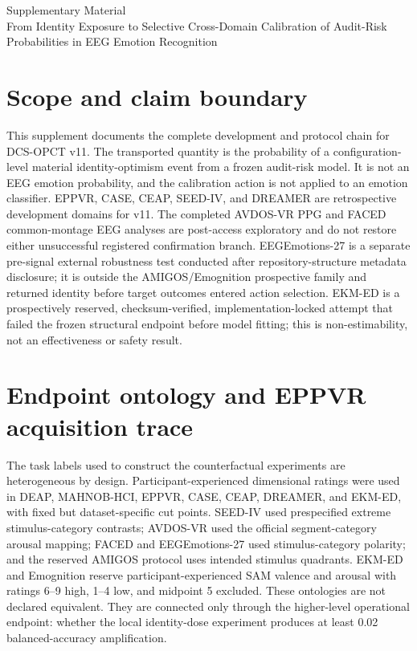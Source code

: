 \documentclass[preprint,12pt]{elsarticle}
\begin{document}
\renewcommand{\thetable}{S\arabic{table}}

\begin{center}
{\Large Supplementary Material}\\[0.5em]
{\large From Identity Exposure to Selective Cross-Domain Calibration of Audit-Risk Probabilities in EEG Emotion Recognition}
\end{center}

\section{Scope and claim boundary}

This supplement documents the complete development and protocol chain for DCS-OPCT v11. The transported quantity is the probability of a configuration-level material identity-optimism event from a frozen audit-risk model. It is not an EEG emotion probability, and the calibration action is not applied to an emotion classifier. EPPVR, CASE, CEAP, SEED-IV, and DREAMER are retrospective development domains for v11. The completed AVDOS-VR PPG and FACED common-montage EEG analyses are post-access exploratory and do not restore either unsuccessful registered confirmation branch. EEGEmotions-27 is a separate pre-signal external robustness test conducted after repository-structure metadata disclosure; it is outside the AMIGOS/Emognition prospective family and returned identity before target outcomes entered action selection. EKM-ED is a prospectively reserved, checksum-verified, implementation-locked attempt that failed the frozen structural endpoint before model fitting; this is non-estimability, not an effectiveness or safety result.

\section{Endpoint ontology and EPPVR acquisition trace}

The task labels used to construct the counterfactual experiments are heterogeneous by design. Participant-experienced dimensional ratings were used in DEAP, MAHNOB-HCI, EPPVR, CASE, CEAP, DREAMER, and EKM-ED, with fixed but dataset-specific cut points. SEED-IV used prespecified extreme stimulus-category contrasts; AVDOS-VR used the official segment-category arousal mapping; FACED and EEGEmotions-27 used stimulus-category polarity; and the reserved AMIGOS protocol uses intended stimulus quadrants. EKM-ED and Emognition reserve participant-experienced SAM valence and arousal with ratings 6--9 high, 1--4 low, and midpoint 5 excluded. These ontologies are not declared equivalent. They are connected only through the higher-level operational endpoint: whether the local identity-dose experiment produces at least 0.02 balanced-accuracy amplification.
\end{document}
